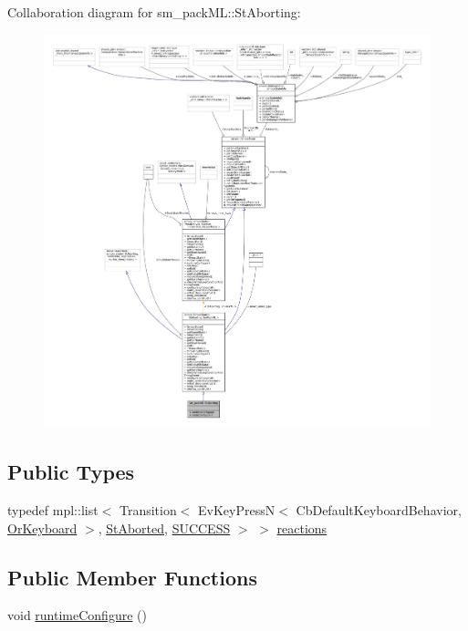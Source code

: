 Collaboration diagram for sm\+\_\+pack\+ML\+:\+:St\+Aborting\+:
\nopagebreak
\begin{figure}[H]
\begin{center}
\leavevmode
\includegraphics[width=350pt]{structsm__packML_1_1StAborting__coll__graph}
\end{center}
\end{figure}
\subsection*{Public Types}
\begin{DoxyCompactItemize}
\item 
typedef mpl\+::list$<$ Transition$<$ Ev\+Key\+PressN$<$ Cb\+Default\+Keyboard\+Behavior, \hyperlink{classsm__packML_1_1OrKeyboard}{Or\+Keyboard} $>$, \hyperlink{structsm__packML_1_1StAborted}{St\+Aborted}, \hyperlink{classSUCCESS}{S\+U\+C\+C\+E\+SS} $>$ $>$ \hyperlink{structsm__packML_1_1StAborting_a45895613faad478b7cdbab9f0b8cb7aa}{reactions}
\end{DoxyCompactItemize}
\subsection*{Public Member Functions}
\begin{DoxyCompactItemize}
\item 
void \hyperlink{structsm__packML_1_1StAborting_a64d1081ac0e6f4ee49e12cc80eda621b}{runtime\+Configure} ()
\end{DoxyCompactItemize}
